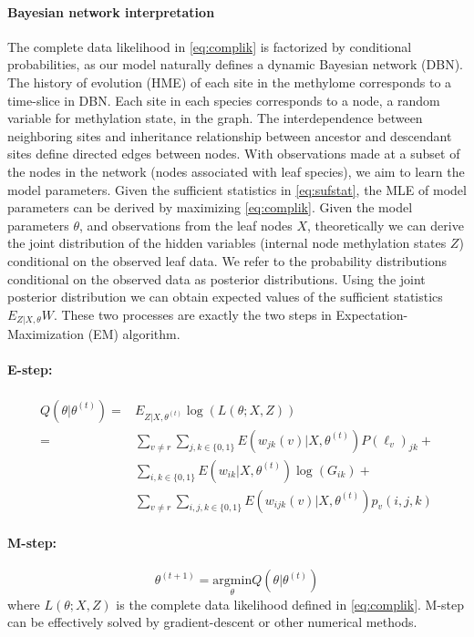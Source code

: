 \documentclass[11pt]{article}
\theoremstyle{theorem}
\theoremstyle{proposition}
\begin{document}
\paragraph{Bayesian network interpretation}
The complete data likelihood in \eqref{eq:complik} is factorized by
conditional probabilities, as our model naturally defines a dynamic
Bayesian network (DBN). The history of evolution (HME) of each site in
the methylome corresponds to a time-slice in DBN. Each site in each
species corresponds to a node, a random variable for methylation
state, in the graph. The interdependence between neighboring sites and
inheritance relationship between ancestor and descendant sites define
directed edges between nodes. With observations made at a subset of
the nodes in the network (nodes associated with leaf species), we aim
to learn the model parameters.  Given the sufficient statistics in
\eqref{eq:sufstat}, the MLE of model parameters can be derived by
maximizing \eqref{eq:complik}. Given the model parameters
$\theta$, and observations from the leaf nodes $X$, theoretically we
can derive the joint distribution of the hidden variables (internal
node methylation states $Z$) conditional on the observed leaf data. We
refer to the probability distributions conditional on the observed
data as posterior distributions. Using the joint posterior
distribution we can obtain expected values of the sufficient
statistics $E_{Z|X,\theta}W$. These two processes are exactly the two
steps in Expectation-Maximization (EM) algorithm.

\paragraph{E-step:}
\begin{equation}
  \begin{aligned}
    Q(\theta|\theta^{(t)}) = & E_{Z|X,\theta^{(t)}} \log(L(\theta; X, Z )) \\
    = & \sum_{v\neq r}\sum_{j,k\in\{0,1\}}E(w_{jk}(v)|X, \theta^{(t)}) P(\ell_v)_{jk} + \\
    & \sum_{i,k\in\{0,1\}}E(w_{ik}|X, \theta^{(t)})\log(G_{ik}) + \\
    & \sum_{v\neq r}\sum_{i,j,k\in\{0,1\}}E(w_{ijk}(v)|X, \theta^{(t)}) p_v(i,j,k)
  \end{aligned}
\end{equation}
\paragraph{M-step:}
\[
\theta^{(t+1)} = \underset{\theta}{\mathrm{argmin}} Q(\theta|\theta^{(t)})
\]
where $L(\theta; X, Z)$ is the complete data likelihood defined in
 \eqref{eq:complik}.
M-step can be effectively solved by gradient-descent or other
numerical methods.
\end{document}
